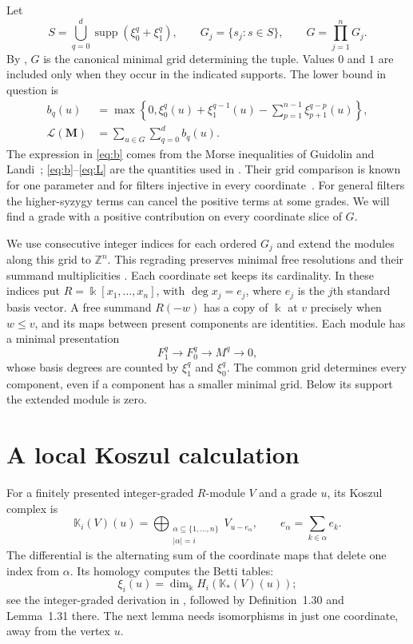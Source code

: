 \documentclass[11pt]{article}
\newcommand{\kk}{\Bbbk}
\newcommand{\supp}{\operatorname{supp}}
\newcommand{\LL}{\mathcal L}
\begin{document}
Let
\begin{equation}\label{eq:grid}
 S=\bigcup_{q=0}^d\supp(\xi_0^q+\xi_1^q),\qquad
 G_j=\{s_j:s\in S\},\qquad G=\prod_{j=1}^nG_j.
\end{equation}
By \cite[Lemma~1.23 and Definition~2.9]{HHT}, $G$ is the canonical
minimal grid determining the tuple. Values $0$ and $1$ are included only
when they occur in the indicated supports.
The lower bound in question is
\begin{align}
 b_q(u)&=\max\left\{0,\xi_0^q(u)+\xi_1^{q-1}(u)
       -\sum_{p=1}^{n-1}\xi_{p+1}^{q-p}(u)\right\},\label{eq:b}\\
 \LL(\mathbf M)&=\sum_{u\in G}\sum_{q=0}^d b_q(u).\label{eq:L}
\end{align}
The expression in \eqref{eq:b} comes from the Morse inequalities of
Guidolin and Landi~\cite[Theorem~7.3]{GL}; \eqref{eq:b}--\eqref{eq:L}
are the quantities used in \cite[Definition~5.7 and Proposition~5.9]{HHT}.
Their grid comparison is known for one parameter and for filters
injective in every coordinate~\cite[Lemma~5.10 and Remark~5.12]{HHT}.
For general filters the higher-syzygy terms can cancel the positive
terms at some grades. We will find a grade with a positive contribution
on every coordinate slice of $G$.

We use consecutive integer indices for each ordered $G_j$ and extend
the modules along this grid to $\mathbb Z^n$. This regrading preserves
minimal free resolutions and their summand multiplicities
\cite[Section~1.4]{HHT}. Each coordinate set keeps its cardinality. In these indices put
$R=\kk[x_1,\ldots,x_n]$, with $\deg x_j=e_j$, where $e_j$ is the
$j$th standard basis vector. A free summand $R(-w)$ has a copy of $\kk$
at $v$ precisely when $w\le v$, and its maps between present components
are identities. Each module has a minimal presentation
\begin{equation}\label{eq:presentation}
 F_1^q\longrightarrow F_0^q\longrightarrow M^q\longrightarrow0,
\end{equation}
whose basis degrees are counted by $\xi_1^q$ and $\xi_0^q$.
The common grid determines every component, even if a component has a
smaller minimal grid. Below its support the extended module is zero.

\section{A local Koszul calculation}

For a finitely presented integer-graded $R$-module $V$ and a grade $u$,
its Koszul complex is
\[
 \mathbb K_i(V)(u)=
 \bigoplus_{\substack{\alpha\subseteq\{1,\ldots,n\}\\|\alpha|=i}}
 V_{u-e_\alpha},\qquad e_\alpha=\sum_{k\in\alpha}e_k.
\]
The differential is the alternating sum of the coordinate maps that
delete one index from $\alpha$. Its homology computes the Betti tables:
\begin{equation}\label{eq:Koszul}
 \xi_i(u)=\dim_\kk H_i(\mathbb K_*(V)(u));
\end{equation}
see the integer-graded derivation in \cite[Section~1.4]{HHT}, followed
by Definition~1.30 and Lemma~1.31 there. The next lemma needs
isomorphisms in just one coordinate, away from the vertex $u$.
\end{document}
